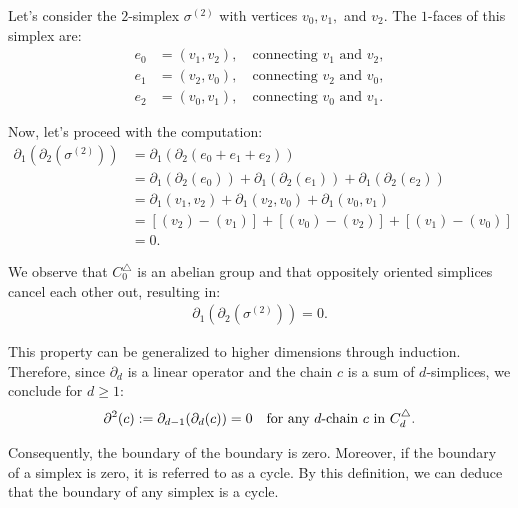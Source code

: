\begin{example}
	Let's consider the \(2\)-simplex \( \sigma^{(2)} \) with vertices \( v_{0}, v_{1}, \) and \( v_{2} \). The \( 1 \)-faces of this simplex are:
	\begin{align}
		e_{0} & = (v_{1}, v_{2}), \quad \text{connecting } v_{1} \text{ and } v_{2}, \\
		e_{1} & = (v_{2}, v_{0}), \quad \text{connecting } v_{2} \text{ and } v_{0}, \\
		e_{2} & = (v_{0}, v_{1}), \quad \text{connecting } v_{0} \text{ and } v_{1}. 
	\end{align}
				
	Now, let's proceed with the computation:
	\begin{align}
		\partial_1(\partial_2(\sigma^{(2)})) & = \partial_1(\partial_2(e_{0} + e_{1} + e_{2}))                                          \\
		                                 & = \partial_1(\partial_2(e_{0})) + \partial_1(\partial_2(e_{1})) + \partial_1(\partial_2(e_{2}))                      \\
		                                 & = \partial_1(v_{1}, v_{2}) + \partial_1(v_{2}, v_{0}) + \partial_1(v_{0}, v_{1}) \\
		                                 & = [(v_{2}) - (v_{1})] + [(v_{0}) - (v_{2})] + [(v_{1}) - (v_{0})]          \\
		                                 & = 0.                                                                       
	\end{align}
				
	We observe that \( C^{\triangle}_{0} \) is an abelian group and that oppositely oriented simplices cancel each other out, resulting in:
	\begin{align}
		\partial_{1}(\partial_2(\sigma^{(2)})) = 0. 
	\end{align}
				
	This property can be generalized to higher dimensions through induction. Therefore, since \( \partial_d \) is a linear operator and the chain \( c \) is a sum of \( d \)-simplices, we conclude for $d \geq 1$:
	\begin{align}
		\partial^{2}(c) := \partial_{d-1}(\partial_{d}(c)) = 0 \quad \text{for any \( d \)-chain \( c \) in } C^{\triangle}_{d}. 
	\end{align}
				
	Consequently, the boundary of the boundary is zero. Moreover, if the boundary of a simplex is zero, it is referred to as a cycle. By this definition, we can deduce that the boundary of any simplex is a cycle.
\end{example}

